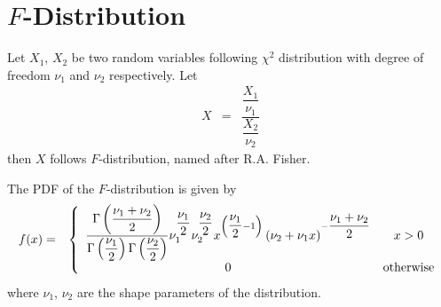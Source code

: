 \section{$F$-Distribution}

Let $X_1$, $X_2$ be two random variables following $\chi^2$ distribution with degree of freedom $\nu_1$ and $\nu_2$ respectively. Let
\begin{eqnarray}
	X &=& \dfrac{\dfrac{X_1}{\nu_1}}{\dfrac{X_2}{\nu_2}} \nonumber
\end{eqnarray}
then $X$ follows $F$-distribution, named after R.A. Fisher.

The PDF of the $F$-distribution is given by
\begin{eqnarray}
	f(x) &=& \left\{\begin{array}{cc}
		\dfrac{\Gamma\left(\dfrac{\nu_1+\nu_2}{2}\right)}{\Gamma\left(\dfrac{\nu_1}{2}\right)\Gamma\left(\dfrac{\nu_2}{2}\right)}\nu_1^{\dfrac{\nu_1}{2}}\nu_2^{\dfrac{\nu_2}{2}}x^{\left(\dfrac{\nu_1}{2}-1\right)}\left(\nu_2+\nu_1 x\right)^{-\dfrac{\nu_1+\nu_2}{2}} & x > 0 \\
		0 & \textup{otherwise}
	\end{array}\right. \nonumber
\end{eqnarray}
where $\nu_1$, $\nu_2$ are the shape parameters of the distribution.
